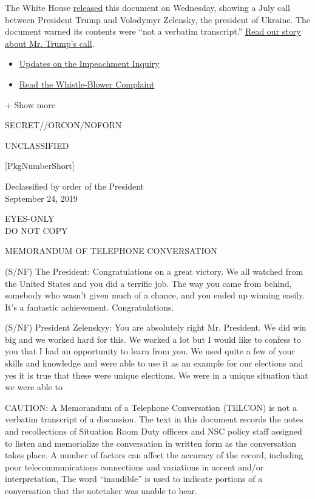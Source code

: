 The White House
\href{https://www.nytimes.com/2019/09/25/us/politics/ukraine-transcript-trump.html}{releas}\href{https://www.nytimes.com/2019/09/25/us/politics/ukraine-transcript-trump.html}{ed}
this document on Wednesday, showing a July call between President Trump
and Volodymyr Zelensky, the president of Ukraine. The document warned
its contents were ``not a verbatim transcript.''
\href{https://www.nytimes.com/2019/09/25/us/politics/donald-trump-impeachment-probe.html}{Read
our story about Mr. Trump's call}.

\begin{itemize}
\tightlist
\item
  \href{https://www.nytimes.com/2019/09/26/us/politics/trump-impeachment.html}{Updates
  on the Impeachment Inquiry}
\item
  \href{https://www.nytimes.com/interactive/2019/09/26/us/politics/whistle-blower-complaint.html}{Read
  the Whistle-Blower Complaint}
\end{itemize}

+ Show more

SECRET//ORCON/NOFORN

UNCLASSIFIED

{[}PkgNumberShort{]}

Declassified by order of the President\\
September 24, 2019

EYES-ONLY\\
DO NOT COPY

MEMORANDUM OF TELEPHONE CONVERSATION

(S/NF) The President: Congratulations on a great victory. We all watched
from the United States and you did a terrific job. The way you came from
behind, somebody who wasn't given much of a chance, and you ended up
winning easily. It's a fantastic achievement. Congratulations.

(S/NF) President Zelenskyy: You are absolutely right Mr. President. We
did win big and we worked hard for this. We worked a lot but I would
like to confess to you that I had an opportunity to learn from you. We
used quite a few of your skills and knowledge and were able to use it as
an example for our elections and yes it is true that these were unique
elections. We were in a unique situation that we were able to

CAUTION: A Memorandum of a Telephone Conversation (TELCON) is not a
verbatim transcript of a discussion. The text in this document records
the notes and recollections of Situation Room Duty officers and NSC
policy staff assigned to listen and memorialize the conversation in
written form as the conversation takes place. A number of factors can
affect the accuracy of the record, including poor telecommunications
connections and variations in accent and/or interpretation, The word
``inaudible'' is used to indicate portions of a conversation that the
notetaker was unable to hear.

